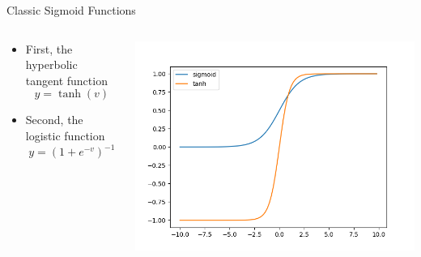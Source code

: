 \documentclass[aspectratio=169]{beamer}
\begin{document}
\begin{frame}{Classic Sigmoid Functions}

\begin{columns}
\begin{column}{0.6\textwidth}
\begin{itemize}
		\item First, the hyperbolic tangent function
		$$y = \tanh(v)$$ %
		\item Second, the logistic function
		$$y = (1 + e^{-v})^{-1}$$ %
\end{itemize}
\end{column}
\begin{column}{0.5\textwidth}
\includegraphics[width=1\textwidth]{lectFF/sigmoidTanh.png}
\end{column}
\end{columns}
\end{frame}
\end{document}
